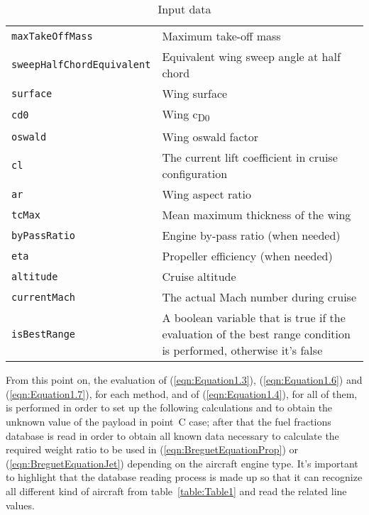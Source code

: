 \begin{table}[!ht]
\begin{tabular}{p{7cm}p{7.5cm}}
\toprule
\lstinline[language=Java]!maxTakeOffMass! & Maximum take-off mass \\[0.1	cm]
\lstinline[language=Java]!sweepHalfChordEquivalent! & Equivalent wing sweep angle at half chord \\[0.1cm]
\lstinline[language=Java]!surface! & Wing surface \\[0.1cm]
\lstinline[language=Java]!cd0!	& Wing c\textsubscript{D0} \\[0.1cm]
\lstinline[language=Java]!oswald!	& Wing oswald factor \\[0.1cm]
\lstinline[language=Java]!cl!	& The current lift coefficient in cruise configuration \\[0.1cm]
\lstinline[language=Java]!ar!	& Wing aspect ratio \\[0.1cm]
\lstinline[language=Java]!tcMax! & Mean maximum thickness of the wing \\[0.1cm]
\lstinline[language=Java]!byPassRatio! & Engine by-pass ratio (when needed) \\[0.1cm]
\lstinline[language=Java]!eta! & Propeller efficiency (when needed) \\[0.1cm]
\lstinline[language=Java]!altitude! & Cruise altitude \\[0.1cm]
\lstinline[language=Java]!currentMach! & The actual Mach number during cruise \\[0.1cm]
\lstinline[language=Java]!isBestRange! & A boolean variable that is true if the evaluation of the best range condition is performed, otherwise it's false         \\
\bottomrule
\end{tabular}
\caption{Input data}
\label{table:Table2}
\end{table}

From this point on, the evaluation of (\ref{eqn:Equation1.3}), (\ref{eqn:Equation1.6}) and (\ref{eqn:Equation1.7}), for each method, and of (\ref{eqn:Equation1.4}), for all of them, is performed in order to set up the following calculations and to obtain the unknown value of the payload in point~C case; after that the fuel fractions database is read in order to obtain all known data necessary to calculate the required weight ratio to be used in (\ref{eqn:BreguetEquationProp}) or (\ref{eqn:BreguetEquationJet}) depending on the aircraft engine type. It’s important to highlight that the database reading process is made up so that it can recognize all different kind of aircraft from table~\ref{table:Table1} and read the related line values.

